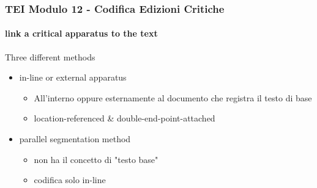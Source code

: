 \begin{frame}
    \frametitle{TEI Modulo 12 - Codifica Edizioni Critiche}
    \framesubtitle{link a critical apparatus to the text}
    \addtocounter{nframe}{1}








    
    \begin{block}{Three different methods}
       \begin{itemize}
           \item in-line or external apparatus
           \begin{itemize}
             \item All'interno oppure esternamente al documento che registra il testo di base
             \item location-referenced & double-end-point-attached
           \end{itemize}
           \item  parallel segmentation method
            \begin{itemize}
                \item non ha il concetto di "testo base"
                \item codifica solo in-line
            \end{itemize}
       \end{itemize}
     \end{block}

\end{frame}



